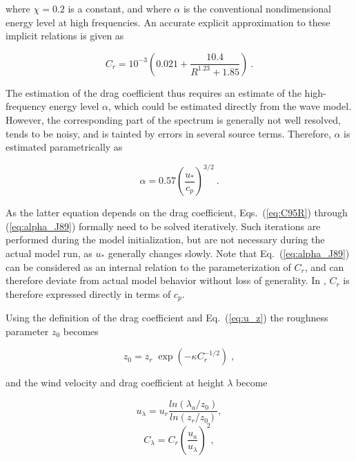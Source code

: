 \noindent
where $\chi = 0.2$ is a constant, and where $\alpha$ is the conventional
nondimensional energy level at high frequencies. An accurate explicit
approximation to these implicit relations is given as

\begin{equation}
C_r = 10^{-3} \left ( 0.021 + \frac{10.4}{R^{1.23}+1.85} \right )
\: . \label{eq:C95Ca} \end{equation}


The estimation of the drag coefficient thus requires an estimate of the
high-frequency energy level $\alpha$, which could be estimated directly from
the wave model. However, the corresponding part of the spectrum is generally
not well resolved, tends to be noisy, and is tainted by errors in several
source terms. Therefore, $\alpha$ is estimated parametrically as
\citep{art:Jan89}


\begin{equation}
\alpha = 0.57 \left ( \frac{u_\ast}{c_p} \right )^{3/2}
\: . \label{eq:alpha_J89} \end{equation}

\noindent
As the latter equation depends on the drag coefficient, Eqs.~(\ref{eq:C95R})
through (\ref{eq:alpha_J89}) formally need to be solved iteratively. Such
iterations are performed during the model initialization, but are not
necessary during the actual model run, as $u_\ast$ generally changes
slowly. Note that Eq.~(\ref{eq:alpha_J89}) can be considered as an internal
relation to the parameterization of $C_r$, and can therefore deviate from
actual model behavior without loss of generality. In \cite{tol:JPO96}, $C_r$
is therefore expressed directly in terms of $c_p$.

Using the definition of the drag coefficient and Eq.~(\ref{eq:u_z}) the
roughness parameter $z_0$ becomes


\begin{equation}
z_0 = z_r \; \exp \left ( - \kappa C_r^{-1/2} \right )
\; , \label{eq:z0} \end{equation}

\noindent
and the wind velocity and drag coefficient at height $\lambda$ become


\begin{equation}
u_{\lambda} = u_r \frac{ln(\lambda_a/z_0)}{ln(z_r/z_0)},
\label{eq:ul} \end{equation} \begin{equation}
C_{\lambda} = C_r \left ( \frac{u_a}{u_\lambda}
\right ) ^2 ,\label{eq:Cl}
\end{equation}

